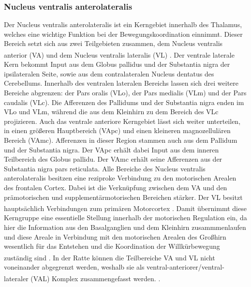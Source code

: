 \documentclass[12pt,a4paper,pdftex]{article}
\begin{document}
\subsubsection{Nucleus ventralis anterolateralis} 
Der Nucleus ventralis anterolateralis ist ein Kerngebiet innerhalb des Thalamus, welches eine wichtige Funktion bei der Bewegungskoordination einnimmt. Dieser Bereich setzt sich aus zwei Teilgebieten zusammen, dem Nucleus ventralis anterior (VA) und dem Nucleus ventralis lateralis (VL) \textsuperscript{\cite[8]{trepel2011neuroanatomie}}. Der ventrale laterale Kern bekommt Input aus dem  Globus pallidus und der Substantia nigra der ipsilateralen Seite, sowie aus dem contralateralen Nucleus dentatus des Cerebellums. Innerhalb des ventralen lateralen Bereichs lassen sich drei weitere Bereiche abgrenzen: der Pars oralis (VLo), der Pars medialis (VLm) und der Pars caudalis (VLc). Die Afferenzen des Pallidums und der Substantia nigra enden im VLo und VLm, während die aus dem Kleinhirn zu dem Bereich des VLc projizieren. Auch das ventrale anteriore Kerngebiet lässt sich weiter unterteilen, in einen größeren Hauptbereich (VApc) und einen kleineren magnozellulären Bereich (VAmc). Afferenzen in dieser Region stammen auch aus dem Pallidum und der Substantia nigra. Der VApc erhält dabei Input aus dem inneren Teilbereich des Globus pallidu. Der VAmc erhält seine Afferenzen aus der Substantia nigra pars reticulata. Alle Bereiche des Nucleus ventralis anterolateralis besitzen eine reziproke Verbindung zu den motorischen Arealen des frontalen Cortex. Dabei ist die Verknüpfung zwischen dem VA und den prämotorischen und supplementärmotorischen Bereichen stärker. Der VL besitzt hauptsächlich Verbindungen zum primären Motorcortex \textsuperscript{\cite[12]{crossman2014neuroanatomy}}. Damit übernimmt diese Kerngruppe eine essentielle Stellung innerhalb der motorischen Regulation ein, da hier die Information aus den Basalganglien und dem Kleinhirn zusammmenlaufen und diese Areale in Verbindung mit den motorischen Arealen des Großhirn wesentlich für das Entstehen und die Koordination der Willkürbewegung zuständig sind \textsuperscript{\cite[8]{trepel2011neuroanatomie}}. In der Ratte können die Teilbereiche VA und VL nicht voneinander abgegrenzt werden, weshalb sie als ventral-anteriorer/ventral-lateraler (VAL) Komplex zusammengefasst werden. \textsuperscript{\cite[16]{paxinos2014rat}}.     
\end{document}

